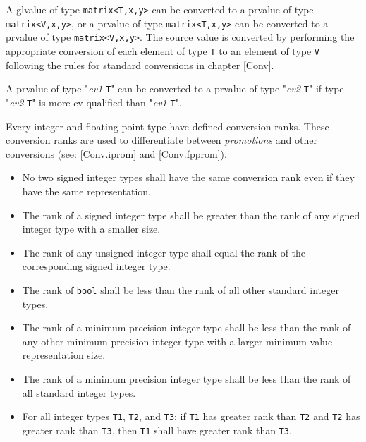 \p A glvalue of type \texttt{matrix<T,x,y>} can be converted to a prvalue of
type \texttt{matrix<V,x,y>}, or a prvalue of type \texttt{matrix<T,x,y>} can be
converted to a prvalue of type \texttt{matrix<V,x,y>}. The source value is
converted by performing the appropriate conversion of each element of type
\texttt{T} to an element of type \texttt{V} following the rules for standard
conversions in chapter \ref{Conv}.


A prvalue of type "\textit{cv1} \texttt{T}" can be converted to a prvalue of type
"\textit{cv2} \texttt{T}" if type "\textit{cv2} \texttt{T}" is more cv-qualified
than "\textit{cv1} \texttt{T}".


\p Every integer and floating point type have defined conversion ranks. These
conversion ranks are used to differentiate between \textit{promotions} and other
conversions (see: \ref{Conv.iprom} and \ref{Conv.fpprom}).


\begin{itemize}
  \item  No two signed integer types shall have the same conversion rank even if
  they have the same representation.
  \item The rank of a signed integer type shall be greater than the rank of any
  signed integer type with a smaller size.
  \item The rank of any unsigned integer type shall equal the rank of the
  corresponding signed integer type.
  \item The rank of \texttt{bool} shall be less than the rank of all other
  standard integer types.
  \item The rank of a minimum precision integer type shall be less than the rank
  of any other minimum precision integer type with a larger minimum value
  representation size.
  \item The rank of a minimum precision integer type shall be less than the rank
  of all standard integer types.
  \item For all integer types \texttt{T1}, \texttt{T2}, and \texttt{T3}: if
  \texttt{T1} has greater rank than \texttt{T2} and \texttt{T2} has greater rank
  than \texttt{T3}, then \texttt{T1} shall have greater rank than \texttt{T3}.
\end{itemize}

